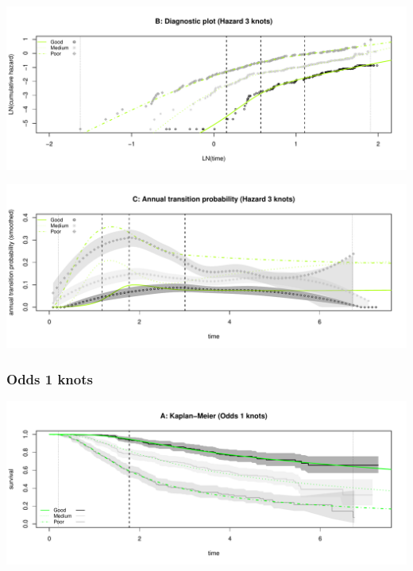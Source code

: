 \documentclass[
]{article}
\begin{document}
\begin{flushleft}\includegraphics[height=0.25\textheight]{BC_OS_output/Images/Figure_spline_models-8} \end{flushleft}

\begin{flushleft}\includegraphics[height=0.25\textheight]{BC_OS_output/Images/Figure_spline_models-9} \end{flushleft}

\clearpage

\subsubsection{Odds 1 knots}\label{odds-1-knots}

\begin{flushleft}\includegraphics[height=0.25\textheight]{BC_OS_output/Images/Figure_spline_models-10} \end{flushleft}
\end{document}
